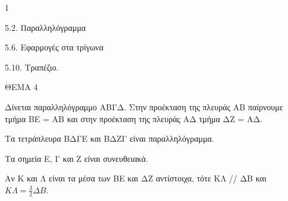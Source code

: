 \begin{ylh}{1}
    \item 5.2. Παραλληλόγραμμα
    \item 5.6. Εφαρμογές στα τρίγωνα
    \item 5.10. Τραπέζιο.
\end{ylh}

ΘΕΜΑ 4

Δίνεται παραλληλόγραμμο ΑΒΓΔ. Στην προέκταση της πλευράς ΑΒ παίρνουμε τμήμα ΒΕ = ΑΒ και στην προέκταση της πλευράς ΑΔ τμήμα ΔΖ = ΑΔ.

\begin{alist}
\item Να αποδείξετε ότι:

.}
\end{alist}
\begin{alist}
\item
  Τα τετράπλευρα ΒΔΓΕ και ΒΔΖΓ είναι παραλληλόγραμμα. 
\item
  Τα σημεία Ε, Γ και Ζ είναι συνευθειακά. 

\item Αν Κ και Λ είναι τα μέσα των ΒΕ και ΔΖ αντίστοιχα, τότε ΚΛ // ΔΒ και $Κ\Lambda = \frac{3}{2}\Delta Β$. 
\end{alist}
